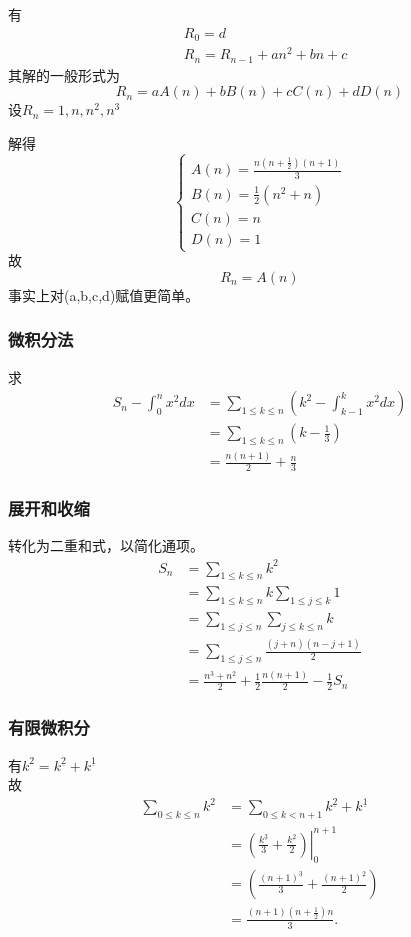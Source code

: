 有
$$
\begin{aligned}
&R_0=d\\
&R_n=R_{n-1}+an^2+bn+c
\end{aligned}
$$
其解的一般形式为
$$
R_n=aA(n)+bB(n)+cC(n)+dD(n)
$$
设$R_n=1,n,n^2,n^3$

解得
$$
\begin{cases}
A(n)=\frac{n(n+\frac{1}{2})(n+1)}{3}\\
B(n)=\frac{1}{2}(n^2+n)\\
C(n)=n\\
D(n)=1
\end{cases}
$$
故
$$
R_n=A(n)
$$
事实上对(a,b,c,d)赋值更简单。

\subsubsection{微积分法}

求
$$
\begin{aligned}
S_n-\int_0^nx^2 dx&=\sum_{1 \le k \le n}\left(k^2-\int_{k-1}^{k} x^2dx \right)\\
&=\sum_{1\le k \le n}(k-\frac{1}{3})\\
&=\frac{n(n+1)}{2}+\frac{n}{3}
\end{aligned}
$$

\subsubsection{展开和收缩}

转化为二重和式，以简化通项。
$$
\begin{aligned}
S_n&=\sum_{1 \le k \le n} k^2\\
&=\sum_{1 \le k \le n}k \sum_{1\le j \le k}1 \\
&=\sum_{1 \le j \le n} \sum_{j\le k \le n} k\\
&=\sum_{1 \le j \le n} \frac{(j+n)(n-j+1)}{2}\\
&=\frac{n^3+n^2}{2}+\frac{1}{2}\frac{n(n+1)}{2}- \frac{1}{2} S_n
\end{aligned}
$$

\subsubsection{有限微积分}

有$k^2=k^{\underline{2}}+k^{\underline{1}}$\\

故
$$
\begin{aligned}  
\sum_{0 \le k \le n} k^2 &= \sum_{0 \le k < n+1} k^{\underline{2}} + k^{\underline{1}} \\
&= \left. \left( \frac{k^{\underline{3}}}{3} + \frac{k^{\underline{2}}}{2} \right) \right|_{0}^{n+1} \\
&= \left( \frac{(n+1)^{\underline{3}}}{3} + \frac{(n+1)^{\underline{2}}}{2} \right) \\
&= \frac{(n+1)(n+\frac{1}{2})n}{3}.  
\end{aligned}
$$


